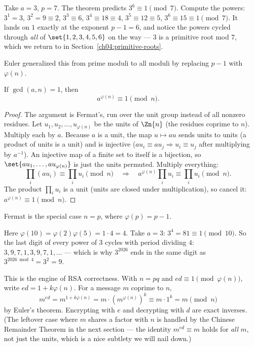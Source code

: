 \begin{example}[Fermat at $p = 7$]
\label{ch04:ex-flt-7}
Take $a = 3$, $p = 7$. The theorem predicts $3^6 \equiv 1 \pmod 7$. Compute the powers:
$3^1 = 3$, $3^2 = 9 \equiv 2$, $3^3 \equiv 6$, $3^4 \equiv 18 \equiv 4$, $3^5 \equiv 12 \equiv 5$,
$3^6 \equiv 15 \equiv 1 \pmod 7$. It lands on $1$ exactly at the exponent $p - 1 = 6$, and notice
the powers cycled through \emph{all} of $\set{1,2,3,4,5,6}$ on the way --- $3$ is a primitive root
mod $7$, which we return to in Section~\ref{ch04:primitive-roots}.
\end{example}

Euler generalized this from prime moduli to all moduli by replacing $p - 1$ with $\varphi(n)$.

\begin{theorem}
\label{ch04:thm-euler}
If $\gcd(a, n) = 1$, then
\[
  a^{\varphi(n)} \equiv 1 \pmod n.
\]
\end{theorem}

\begin{proof}
The argument is Fermat's, run over the unit group instead of all nonzero residues. Let
$u_1, u_2, \dots, u_{\varphi(n)}$ be the units of $\Zn{n}$ (the residues coprime to $n$). Multiply
each by $a$. Because $a$ is a unit, the map $u \mapsto au$ sends units to units (a product of units
is a unit) and is injective ($au_i \equiv au_j \Rightarrow u_i \equiv u_j$ after multiplying by
$a^{-1}$). An injective map of a finite set to itself is a bijection, so $\set{au_1, \dots,
au_{\varphi(n)}}$ is just the units permuted. Multiply everything:
\[
  \prod_i (a u_i) \equiv \prod_i u_i \pmod n
  \quad\Longrightarrow\quad
  a^{\varphi(n)} \prod_i u_i \equiv \prod_i u_i \pmod n.
\]
The product $\prod_i u_i$ is a unit (units are closed under multiplication), so cancel it:
$a^{\varphi(n)} \equiv 1 \pmod n$.
\end{proof}

Fermat is the special case $n = p$, where $\varphi(p) = p - 1$.

\begin{example}[Euler at $n = 10$]
\label{ch04:ex-euler-10}
Here $\varphi(10) = \varphi(2)\varphi(5) = 1 \cdot 4 = 4$. Take $a = 3$:
$3^4 = 81 \equiv 1 \pmod{10}$. So the last digit of every power of $3$ cycles with period dividing
$4$: $3, 9, 7, 1, 3, 9, 7, 1, \dots$ --- which is why $3^{2026}$ ends in the same digit as
$3^{2026 \bmod 4} = 3^2 = 9$.
\end{example}

\begin{whybox}
This is the engine of RSA correctness. With $n = pq$ and $ed \equiv 1 \pmod{\varphi(n)}$, write
$ed = 1 + k\varphi(n)$. For a message $m$ coprime to $n$,
\[
  m^{ed} = m^{1 + k\varphi(n)} = m \cdot \left(m^{\varphi(n)}\right)^k \equiv m \cdot 1^k = m
  \pmod n
\]
by Euler's theorem. Encrypting with $e$ and decrypting with $d$ are exact inverses. (The leftover
case where $m$ shares a factor with $n$ is handled by the Chinese Remainder Theorem in the next
section --- the identity $m^{ed} \equiv m$ holds for \emph{all} $m$, not just the units, which is a
nice subtlety we will nail down.)
\end{whybox}

